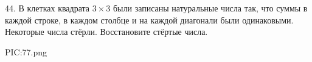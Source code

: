44. В клетках квадрата $3\times3$ были записаны натуральные числа так, что суммы в каждой строке, в каждом столбце и на каждой диагонали были одинаковыми. Некоторые числа стёрли. Восстановите стёртые числа.
\begin{center}
{{PIC:77.png}}
\end{center}
